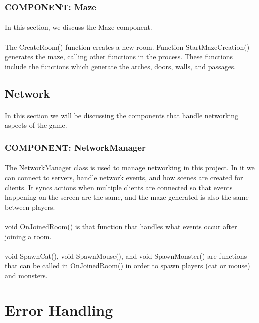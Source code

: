 \documentclass[12pt, titlepage]{article}
\begin{document}
\subsubsection{COMPONENT: Maze}
\paragraph{}In this section, we discuss the Maze component. 
\paragraph{} The CreateRoom() function creates a new room. Function StartMazeCreation() generates the maze, calling other functions in the process. These functions include the functions which generate the arches, doors, walls, and passages.
\subsection{Network}
\paragraph{} In this section we will be discussing the components that handle networking aspects of the game.
\subsubsection{COMPONENT: NetworkManager}
\paragraph{} The NetworkManager class is used to manage networking in this project. In it we can connect to servers, handle network events, and how scenes are created for clients. It syncs actions when multiple clients are connected so that events happening on the screen are the same, and the maze generated is also the same between players.
\paragraph{} void OnJoinedRoom() is that function that handles what events occur after joining a room.
\paragraph{} void SpawnCat(), void SpawnMouse(), and void SpawnMonster() are functions that can be called in OnJoinedRoom() in order to spawn players (cat or mouse) and monsters.
\section{Error Handling} 
\end{document}
